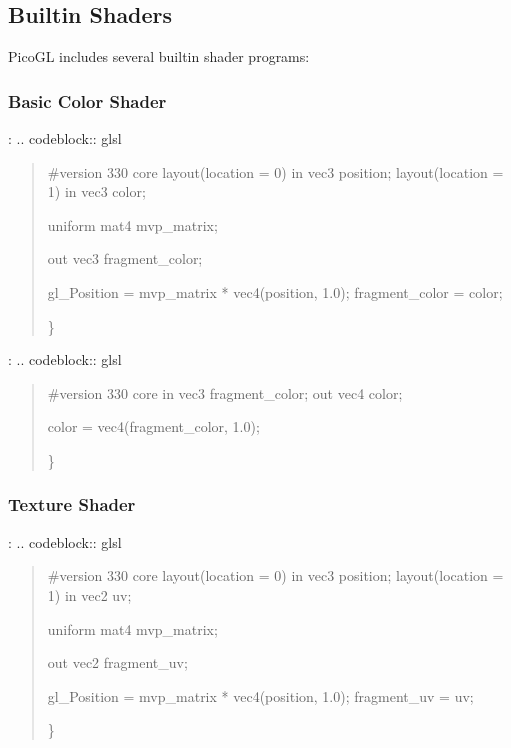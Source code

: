 \documentclass[a4paper,10pt,english,openany,oneside]{sphinxmanual}
\begin{document}
\subsection{Built\sphinxhyphen{}in Shaders}
\label{\detokenize{api/shaders:built-in-shaders}}
\sphinxAtStartPar
PicoGL includes several built\sphinxhyphen{}in shader programs:


\subsubsection{Basic Color Shader}
\label{\detokenize{api/shaders:basic-color-shader}}
\sphinxAtStartPar
{}:
.. code\sphinxhyphen{}block:: glsl
\begin{quote}

\sphinxAtStartPar
\#version 330 core
layout(location = 0) in vec3 position;
layout(location = 1) in vec3 color;

\sphinxAtStartPar
uniform mat4 mvp\_matrix;

\sphinxAtStartPar
out vec3 fragment\_color;
\begin{description}
\sphinxAtStartPar
gl\_Position = mvp\_matrix * vec4(position, 1.0);
fragment\_color = color;

\end{description}

\sphinxAtStartPar
\}
\end{quote}

\sphinxAtStartPar
{}:
.. code\sphinxhyphen{}block:: glsl
\begin{quote}

\sphinxAtStartPar
\#version 330 core
in vec3 fragment\_color;
out vec4 color;
\begin{description}
\sphinxAtStartPar
color = vec4(fragment\_color, 1.0);

\end{description}

\sphinxAtStartPar
\}
\end{quote}


\subsubsection{Texture Shader}
\label{\detokenize{api/shaders:texture-shader}}
\sphinxAtStartPar
{}:
.. code\sphinxhyphen{}block:: glsl
\begin{quote}

\sphinxAtStartPar
\#version 330 core
layout(location = 0) in vec3 position;
layout(location = 1) in vec2 uv;

\sphinxAtStartPar
uniform mat4 mvp\_matrix;

\sphinxAtStartPar
out vec2 fragment\_uv;
\begin{description}
\sphinxAtStartPar
gl\_Position = mvp\_matrix * vec4(position, 1.0);
fragment\_uv = uv;

\end{description}

\sphinxAtStartPar
\}
\end{quote}
\end{document}
